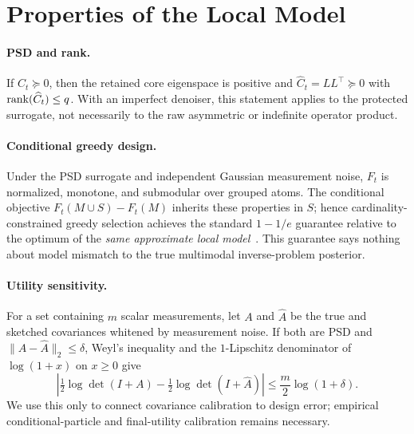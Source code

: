 \section{Properties of the Local Model}

\paragraph{PSD and rank.}
If $C_t\succeq0$, then the retained core eigenspace is positive and
$\widehat C_t=LL^\top\succeq0$ with
$\operatorname{rank}(\widehat C_t)\leq q$.  With an imperfect denoiser, this statement
applies to the protected surrogate, not necessarily to the raw asymmetric or
indefinite operator product.

\paragraph{Conditional greedy design.}
Under the PSD surrogate and independent Gaussian measurement noise, $F_t$ is
normalized, monotone, and submodular over grouped atoms.  The conditional
objective $F_t(M\cup S)-F_t(M)$ inherits these properties in $S$; hence
cardinality-constrained greedy selection achieves the standard
$1-1/e$ guarantee relative to the optimum of the \emph{same approximate local
model}~\cite{nemhauser1978analysis}.  This guarantee says nothing about model
mismatch to the true multimodal inverse-problem posterior.

\paragraph{Utility sensitivity.}
For a set containing $m$ scalar measurements, let $A$ and $\widehat A$ be the
true and sketched covariances whitened by measurement noise.  If both are PSD
and $\|A-\widehat A\|_2\leq\delta$, Weyl's inequality and the
$1$-Lipschitz denominator of $\log(1+x)$ on $x\geq0$ give
\begin{equation}
 \left|\tfrac12\log\det(I+A)
 -\tfrac12\log\det(I+\widehat A)\right|
 \leq \frac{m}{2}\log(1+\delta).
\end{equation}
We use this only to connect covariance calibration to design error; empirical
conditional-particle and final-utility calibration remains necessary.
